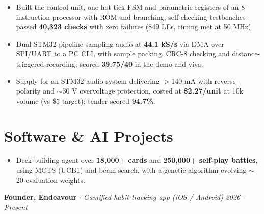 \documentclass[10pt,a4paper]{article}
\begin{document}
\begin{itemize}[noitemsep, topsep=1pt, leftmargin=*]
    \item Built the control unit, one-hot tick FSM and parametric registers of an 8-instruction processor with ROM and branching; self-checking testbenches passed \textbf{40,323 checks} with zero failures (849 LEs, timing met at 50 MHz).
\end{itemize}

\begin{itemize}[noitemsep, topsep=1pt, leftmargin=*]
    \item Dual-STM32 pipeline sampling audio at \textbf{44.1 kS/s} via DMA over SPI/UART to a PC CLI, with sample packing, CRC-8 checking and distance-triggered recording; scored \textbf{39.75/40} in the demo and viva.
\end{itemize}

\begin{itemize}[noitemsep, topsep=1pt, leftmargin=*]
    \item Supply for an STM32 audio system delivering $>$140 mA with reverse-polarity and $\sim$30 V overvoltage protection, costed at \textbf{\$2.27/unit} at 10k volume (vs \$5 target); tender scored \textbf{94.7\%}.
\end{itemize}

\section{Software \& AI Projects}

\begin{itemize}[noitemsep, topsep=1pt, leftmargin=*]
    \item Deck-building agent over \textbf{18,000+ cards} and \textbf{250,000+ self-play battles}, using MCTS (UCB1) and beam search, with a genetic algorithm evolving $\sim$20 evaluation weights.
\end{itemize}

\textbf{Founder, Endeavour} $\cdot$ \textit{Gamified habit-tracking app (iOS / Android)} \hfill \textit{2026 -- Present}
\end{document}
